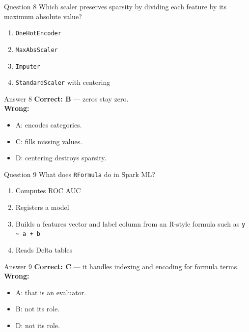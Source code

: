 \documentclass[aspectratio=169,11pt]{beamer}
\begin{document}
\begin{frame}{Question 8}
Which scaler preserves sparsity by dividing each feature by its maximum absolute value?
\begin{enumerate}[label=\Alph*.]
\item \texttt{OneHotEncoder}
\item \texttt{MaxAbsScaler}
\item \texttt{Imputer}
\item \texttt{StandardScaler} with centering
\end{enumerate}
\end{frame}
\begin{frame}{Answer 8}
\textbf{Correct: B} --- zeros stay zero.\\
\vspace{0.5em}
\textbf{Wrong:}
\begin{itemize}
\item A: encodes categories.
\item C: fills missing values.
\item D: centering destroys sparsity.
\end{itemize}
\end{frame}

\begin{frame}{Question 9}
What does \texttt{RFormula} do in Spark ML?
\begin{enumerate}[label=\Alph*.]
\item Computes ROC AUC
\item Registers a model
\item Builds a features vector and label column from an R-style formula such as \texttt{y \textasciitilde{} a + b}
\item Reads Delta tables
\end{enumerate}
\end{frame}
\begin{frame}{Answer 9}
\textbf{Correct: C} --- it handles indexing and encoding for formula terms.\\
\vspace{0.5em}
\textbf{Wrong:}
\begin{itemize}
\item A: that is an evaluator.
\item B: not its role.
\item D: not its role.
\end{itemize}
\end{frame}
\end{document}
